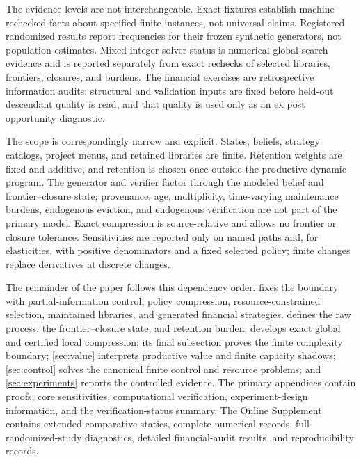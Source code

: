 The evidence levels are not interchangeable. Exact fixtures establish
machine-rechecked facts about specified finite instances, not universal
claims. Registered randomized results report frequencies for their frozen
synthetic generators, not population estimates. Mixed-integer solver status
is numerical global-search evidence and is reported separately from exact
rechecks of selected libraries, frontiers, closures, and burdens. The
financial exercises are retrospective information audits: structural and
validation inputs are fixed before held-out descendant quality is read, and
that quality is used only as an ex post opportunity diagnostic.

The scope is correspondingly narrow and explicit. States, beliefs, strategy
catalogs, project menus, and retained libraries are finite. Retention weights
are fixed and additive, and retention is chosen once outside the productive
dynamic program. The generator and verifier factor through the modeled belief
and frontier--closure state; provenance, age, multiplicity, time-varying
maintenance burdens, endogenous eviction, and endogenous verification are not
part of the primary model. Exact compression is source-relative and allows no
frontier or closure tolerance. Sensitivities are reported only on named paths
and, for elasticities, with positive denominators and a fixed selected policy;
finite changes replace derivatives at discrete changes.

The remainder of the paper follows this dependency order.
 fixes the boundary with partial-information
control, policy compression, resource-constrained selection, maintained
libraries, and generated financial strategies.  defines the
raw process, the frontier--closure state, and retention burden.
 develops exact global and certified local compression;
its final subsection proves the finite complexity boundary;
\cref{sec:value} interprets productive value and finite capacity shadows;
\cref{sec:control} solves the canonical finite control and resource problems;
and \cref{sec:experiments} reports the controlled evidence. The primary
appendices contain proofs, core sensitivities, computational verification,
experiment-design information, and the verification-status summary. The
Online Supplement contains extended comparative statics, complete numerical
records, full randomized-study diagnostics, detailed financial-audit results,
and reproducibility records.

\clearpage
